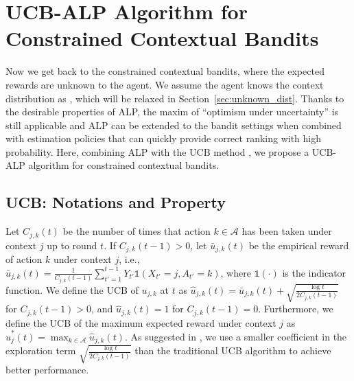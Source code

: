 \section{UCB-ALP Algorithm for Constrained Contextual Bandits} \label{sec:ucb_dp}
Now we get back  to the constrained contextual bandits, where  the expected rewards are unknown to the agent.
We assume the agent knows the context distribution as \cite{Badanidiyuru2014COLT}, which will be relaxed in Section~\ref{sec:unknown_dist}.
Thanks to the desirable properties of ALP, the maxim of ``optimism under uncertainty'' \cite{Auer2007UCB4RL} is still applicable and ALP can be extended  to the  bandit settings when combined with estimation policies that can quickly provide correct ranking with high probability.
Here, combining ALP with the UCB method \cite{Auer2002ML:UCB}, we propose a UCB-ALP algorithm for constrained contextual bandits.


\subsection{UCB: Notations and Property}
Let $C_{j,k}(t)$ be the number of times that action  $k \in \mathcal{A}$ has been taken under context $j$ up to round $t$. If $C_{j,k}(t-1) > 0$, let $\bar{u}_{j,k}(t)$ be the empirical reward of action $k$ under context $j$, i.e.,
$\bar{u}_{j,k}(t) = \frac{1}{C_{j,k}(t-1)}\sum_{t' = 1}^{t-1} {Y_{t'} \mathds{1}({X_{t'} = j, A_{t'} = k})}$,
where $\mathds{1}(\cdot)$ is the indicator function.
We define the UCB of $u_{j,k}$ at $t$ as
$\hat{u}_{j,k}(t) = \bar{u}_{j,k}(t) + \sqrt{\frac{{\log t}}{2C_{j,k}(t-1)}}$ for $C_{j,k}(t-1) > 0$, and $\hat{u}_{j,k}(t) = 1$ for $C_{j,k}(t-1) = 0$. Furthermore, we define the UCB of the maximum expected reward under context $j$ as
$
\hat{u}_{j}^*(t) = \max_{k \in \mathcal{A}}\hat{u}_{j,k}(t)
$.
As suggested in \cite{Garivierkl2011COLT:KL-UCB}, we use a smaller coefficient in the exploration term $\sqrt{\frac{{\log t}}{2C_{j,k}(t-1)}}$ than the traditional UCB algorithm \cite{Auer2002ML:UCB} to achieve better performance.

